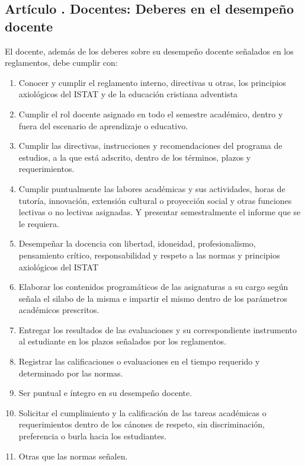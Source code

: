 \subsection{Artículo . Docentes: Deberes en el desempeño docente}
\addtocounter{ns}{1}
El docente, además de los deberes sobre su desempeño docente señalados en los reglamentos, debe cumplir con: 
\begin{enumerate}
\item Conocer y cumplir el reglamento interno, directivas u otras, los principios axiológicos del ISTAT y de la educación cristiana adventista 
\item Cumplir el rol docente asignado en todo el semestre académico, dentro y fuera del escenario de aprendizaje o educativo. 
\item Cumplir las directivas, instrucciones y recomendaciones del programa de estudios, a la que está adscrito, dentro de los términos, plazos y requerimientos. 
\item Cumplir puntualmente las labores académicas y sus actividades, horas de tutoría, innovación, extensión cultural o proyección social y otras funciones lectivas o no lectivas asignadas. Y presentar semestralmente el informe que se le requiera. 
\item Desempeñar la docencia con libertad, idoneidad, profesionalismo, pensamiento crítico, responsabilidad y respeto a las normas y principios axiológicos del ISTAT 
\item Elaborar los contenidos programáticos de las asignaturas a su cargo según señala el silabo de la misma e impartir el mismo dentro de los parámetros académicos prescritos. 
\item Entregar los resultados de las evaluaciones y su correspondiente instrumento al estudiante en los plazos señalados por los reglamentos. 
\item Registrar las calificaciones o evaluaciones en el tiempo requerido y determinado por las normas. 
\item Ser puntual e íntegro en su desempeño docente. 
\item Solicitar el cumplimiento y la calificación de las tareas académicas o requerimientos dentro de los cánones de respeto, sin discriminación, preferencia o burla hacia los estudiantes.
\item Otras que las normas señalen.
\end{enumerate}
